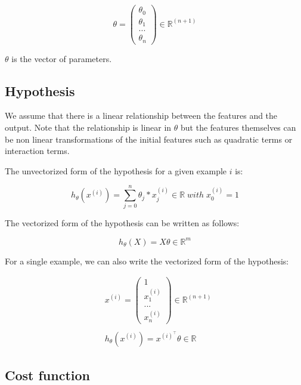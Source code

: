 \documentclass[a4paper, 12pt]{article}
\begin{document}
\begin{equation}
\theta = \begin{pmatrix}  \theta_0 \\ \theta_1 \\ ... \\ \theta_n \end{pmatrix} \in \mathbb{R}^{(n+1)} 
\end{equation}

$\theta$ is the vector of parameters.

\subsection{Hypothesis}

We assume that there is a linear relationship between the features and the output. Note that the relationship is linear in $\theta$ but the features themselves can be non linear transformations of the initial features such as quadratic terms or interaction terms.

\noindent
The unvectorized form of the hypothesis for a given example $i$ is:

\begin{equation}
h_{\theta}(x^{(i)}) = \sum_{j=0}^{n} \theta_j * x_j^{(i)} \in \mathbb{R} \; with \;  x_0^{(i)}=1
\end{equation}

\noindent
The vectorized form of the hypothesis can be written as follows:

\begin{equation}
h_{\theta}(X) = X\theta \in \mathbb{R}^{m} 
\end{equation}

\noindent
For a single example, we can also write the vectorized form of the hypothesis:

\begin{align*} 
& x^{(i)} = \begin{pmatrix} 1 \\ x_1^{(i)} \\ ... \\ x_n^{(i)} \end{pmatrix}  \in \mathbb{R}^{(n+1)}  \\
& \\
& h_{\theta}(x^{(i)})  = x^{(i)^{\top}}\theta \in \mathbb{R}
\end{align*}

\subsection{Cost function}
\end{document}
